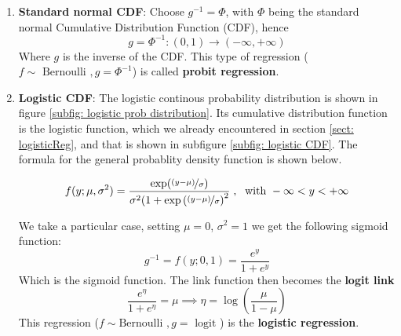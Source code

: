       \begin{enumerate}
        \item \textbf{Standard normal CDF}: Choose $g^{-1}=\Phi$, with $\Phi$
        being the standard normal Cumulative Distribution Function (CDF), hence
          $$g = \Phi^{-1} : (0,1) \to (-\infty, +\infty)$$ Where $g$ is the
          inverse of the CDF. This type of regression ($f \sim \text{ Bernoulli
          }, g = \Phi^{-1}$) is called \textbf{probit regression}.


        \item \textbf{Logistic CDF}: The logistic continous probability
         distribution is shown in figure \ref{subfig: logistic prob
         distribution}. Its cumulative distribution function is the logistic
         function, which we already encountered in section \ref{sect:
         logisticReg}, and that is shown in subfigure \ref{subfig: logistic
         CDF}. The formula for the general probablity density function is shown
         below.

          $$f(y; \mu, \sigma^2) =
          \frac{\exp(\nicefrac{(y-\mu)}{\sigma})}{\sigma^2(1 +
          \exp\left(\nicefrac{(y-\mu)}{\sigma}\right)^2}\;,\; \text{ with }
          -\infty < y < +\infty$$ 
          
          We take a particular case, setting $\mu = 0$, $\sigma^2 = 1$ we get
          the following sigmoid function:
          $$g^{-1} = f(y; 0, 1) = \frac{e^y}{1 + e^y}$$ Which is the sigmoid
          function. The link function then becomes the \textbf{logit link}
          $$\frac{e^\eta}{1 + e^\eta} = \mu \implies \eta =
          \log\left(\frac{\mu}{1-\mu}\right)$$ This regression ($f \sim \text{
          Bernoulli }, g = \text{ logit }$) is the \textbf{logistic regression}. 

          \begin{figure}[H]
            \centering
            

\end{figure}
\end{enumerate}
